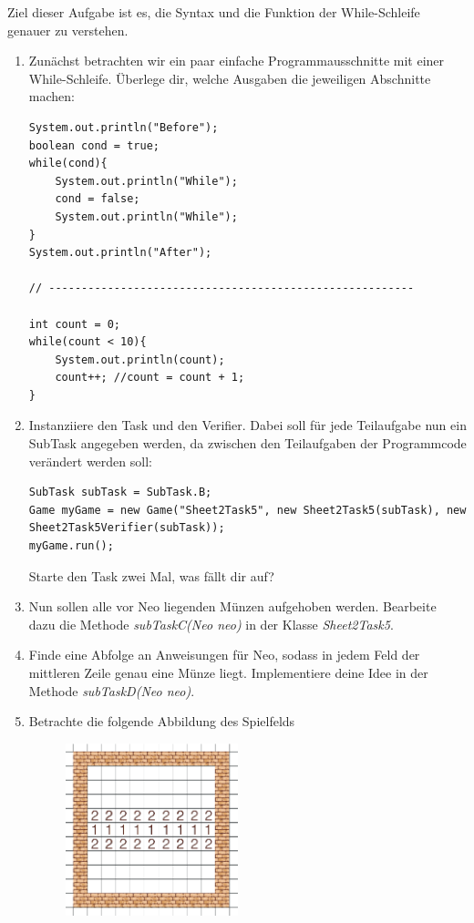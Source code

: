 
Ziel dieser Aufgabe ist es, die Syntax und die Funktion der While-Schleife genauer zu verstehen.
\begin{enumerate}[label=\alph*)]
    \item Zunächst betrachten wir ein paar einfache Programmausschnitte mit einer While-Schleife.
    Überlege dir, welche Ausgaben die jeweiligen Abschnitte machen:
    \begin{lstlisting}
System.out.println("Before");
boolean cond = true;
while(cond){
    System.out.println("While");
    cond = false;
    System.out.println("While");
}
System.out.println("After");

// --------------------------------------------------------

int count = 0;
while(count < 10){
    System.out.println(count);
    count++; //count = count + 1;
}
    \end{lstlisting}
    \item Instanziiere den Task und den Verifier. Dabei soll für jede Teilaufgabe nun ein SubTask angegeben werden, da zwischen
    den Teilaufgaben der Programmcode verändert werden soll:
    \begin{lstlisting}[breaklines=true]
SubTask subTask = SubTask.B;
Game myGame = new Game("Sheet2Task5", new Sheet2Task5(subTask), new Sheet2Task5Verifier(subTask));
myGame.run();
    \end{lstlisting}
    Starte den Task zwei Mal, was fällt dir auf?
    \item Nun sollen alle vor Neo liegenden Münzen aufgehoben werden. Bearbeite dazu die Methode \textit{subTaskC(Neo neo)} in der Klasse \textit{Sheet2Task5}.
    \item Finde eine Abfolge an Anweisungen für Neo, sodass in jedem Feld der mittleren Zeile genau eine Münze liegt. Implementiere deine Idee in der Methode
    \textit{subTaskD(Neo neo)}.
    \item Betrachte die folgende Abbildung des Spielfelds
    \begin{figure}[h!]
        \centering
        \includegraphics[height=5cm]{figures/ex05e.png}

\end{figure}
\end{enumerate}
